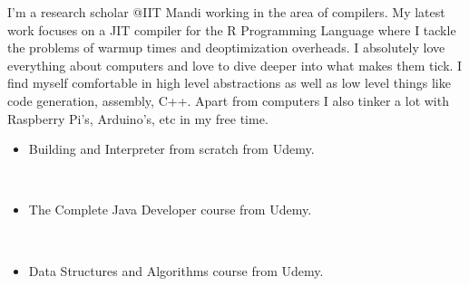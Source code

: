 \documentclass[10pt,a4paper,ragged2e]{altacv}
\begin{document}
\smallskip
{}

\begin{fullwidth}
\makecvheader
\end{fullwidth}



\begin{justifying}
  \noindent
  I'm a research scholar @IIT Mandi working in the area of compilers.
  My latest work focuses on a JIT compiler for the R Programming Language where I tackle the problems of warmup times and deoptimization overheads.
  I absolutely love everything about computers and love to dive deeper into what makes them tick.
  I find myself comfortable in high level abstractions as well as low level things like code generation, assembly, C++.
  Apart from computers I also tinker a lot with Raspberry Pi's, Arduino's, etc in my free time.

\end{justifying}



\begin{itemize}
  \item Building and Interpreter from scratch from Udemy.
\end{itemize}\

\smallskip

\begin{itemize}
\item The Complete Java Developer course from Udemy.
\end{itemize}\

\smallskip

\begin{itemize}
\item Data Structures and Algorithms course from Udemy.
\end{itemize}\
\end{document}
